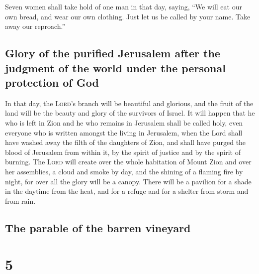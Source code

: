  Seven women shall take hold of one man in that day,
saying, ``We will eat our own bread, and wear our own clothing. Just let
us be called by your name. Take away our reproach.''

\hypertarget{glory-of-the-purified-jerusalem-after-the-judgment-of-the-world-under-the-personal-protection-of-god}{%
\subsection{Glory of the purified Jerusalem after the judgment of the
world under the personal protection of
God}\label{glory-of-the-purified-jerusalem-after-the-judgment-of-the-world-under-the-personal-protection-of-god}}

 In that day, the \textsc{Lord}'s branch will be beautiful
and glorious, and the fruit of the land will be the beauty and glory of
the survivors of Israel.  It will happen that he who is
left in Zion and he who remains in Jerusalem shall be called holy, even
everyone who is written amongst the living in Jerusalem, 
when the Lord shall have washed away the filth of the daughters of Zion,
and shall have purged the blood of Jerusalem from within it, by the
spirit of justice and by the spirit of burning.  The
\textsc{Lord} will create over the whole habitation of Mount Zion and
over her assemblies, a cloud and smoke by day, and the shining of a
flaming fire by night, for over all the glory will be a canopy.
 There will be a pavilion for a shade in the daytime from
the heat, and for a refuge and for a shelter from storm and from rain.

\hypertarget{the-parable-of-the-barren-vineyard}{%
\subsection{The parable of the barren
vineyard}\label{the-parable-of-the-barren-vineyard}}

\hypertarget{section-4}{%
\section{5}\label{section-4}}

